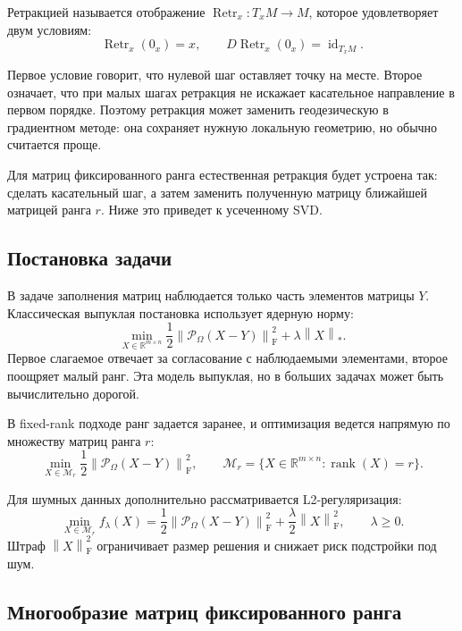 \documentclass[a4paper,12pt]{article}
\newcommand{\R}{\mathbb{R}}
\newcommand{\fro}[1]{\left\lVert #1 \right\rVert_{\mathrm F}}
\newcommand{\nuc}[1]{\left\lVert #1 \right\rVert_*}
\newcommand{\rank}{\operatorname{rank}}
\renewcommand{\Proj}{\mathcal{P}}
\newcommand{\Mcal}{\mathcal{M}}
\newcommand{\Retr}{\operatorname{Retr}}
\begin{document}
\begin{definition}
Ретракцией называется отображение $\Retr_x:T_xM\to M$, которое удовлетворяет двум условиям:
\[
\Retr_x(0_x)=x,
\qquad
D\Retr_x(0_x)=\operatorname{id}_{T_xM}.
\]
\end{definition}

Первое условие говорит, что нулевой шаг оставляет точку на месте. Второе означает, что при малых шагах ретракция не искажает касательное направление в первом порядке. Поэтому ретракция может заменить геодезическую в градиентном методе: она сохраняет нужную локальную геометрию, но обычно считается проще.

Для матриц фиксированного ранга естественная ретракция будет устроена так: сделать касательный шаг, а затем заменить полученную матрицу ближайшей матрицей ранга $r$. Ниже это приведет к усеченному SVD.

\subsection{Постановка задачи}

В задаче заполнения матриц наблюдается только часть элементов матрицы $Y$. Классическая выпуклая постановка использует ядерную норму:
\begin{equation}
\label{eq:convex-final}
\min_{X \in \R^{m\times n}}
\frac12 \fro{\Proj_\Omega(X-Y)}^2 + \lambda \nuc{X}.
\end{equation}
Первое слагаемое отвечает за согласование с наблюдаемыми элементами, второе поощряет малый ранг. Эта модель выпуклая, но в больших задачах может быть вычислительно дорогой.

В fixed-rank подходе ранг задается заранее, и оптимизация ведется напрямую по множеству матриц ранга $r$:
\begin{equation}
\label{eq:fixed-rank-final}
\min_{X \in \Mcal_r}
\frac12 \fro{\Proj_\Omega(X-Y)}^2,
\qquad
\Mcal_r=\{X\in\R^{m\times n}:\rank(X)=r\}.
\end{equation}

Для шумных данных дополнительно рассматривается L2-регуляризация:
\begin{equation}
\label{eq:fixed-rank-regularized}
\min_{X \in \Mcal_r} f_\lambda(X)
= \frac12 \fro{\Proj_\Omega(X-Y)}^2 + \frac{\lambda}{2}\fro{X}^2,
\qquad \lambda\ge 0.
\end{equation}
Штраф $\fro{X}^2$ ограничивает размер решения и снижает риск подстройки под шум.

\subsection{Многообразие матриц фиксированного ранга}
\end{document}
